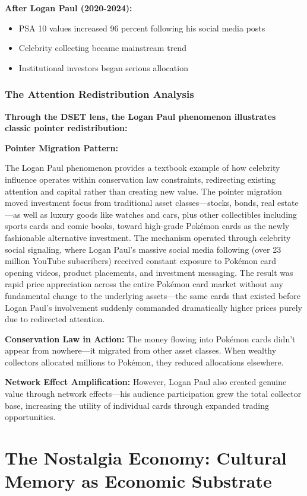 \documentclass[11pt,oneside]{book}
\begin{document}
{{{{{{\textbf{After Logan Paul (2020-2024):}
\begin{itemize}
\item PSA 10 values increased 96 percent following his social media posts
\item Celebrity collecting became mainstream trend
\item Institutional investors began serious allocation
\end{itemize}

\subsubsection{The Attention Redistribution Analysis}

\textbf{Through the DSET lens, the Logan Paul phenomenon illustrates classic pointer redistribution:}

\textbf{Pointer Migration Pattern:}

The Logan Paul phenomenon provides a textbook example of how celebrity influence operates within conservation law constraints, redirecting existing attention and capital rather than creating new value. The pointer migration moved investment focus from traditional asset classes—stocks, bonds, real estate—as well as luxury goods like watches and cars, plus other collectibles including sports cards and comic books, toward high-grade Pokémon cards as the newly fashionable alternative investment. The mechanism operated through celebrity social signaling, where Logan Paul's massive social media following (over 23 million YouTube subscribers) received constant exposure to Pokémon card opening videos, product placements, and investment messaging. The result was rapid price appreciation across the entire Pokémon card market without any fundamental change to the underlying assets—the same cards that existed before Logan Paul's involvement suddenly commanded dramatically higher prices purely due to redirected attention.

\textbf{Conservation Law in Action:}
The money flowing into Pokémon cards didn't appear from nowhere—it migrated from other asset classes. When wealthy collectors allocated millions to Pokémon, they reduced allocations elsewhere.

\textbf{Network Effect Amplification:}
However, Logan Paul also created genuine value through network effects—his audience participation grew the total collector base, increasing the utility of individual cards through expanded trading opportunities.

\section{The Nostalgia Economy: Cultural Memory as Economic Substrate}

}}}}}}
\end{document}
